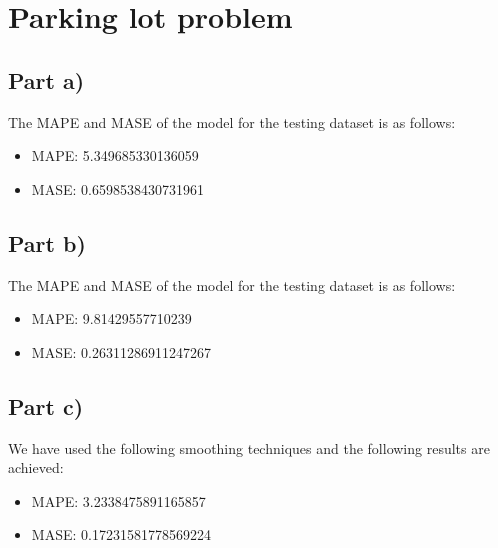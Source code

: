 \section{Parking lot problem}
\subsection{Part a)}
The MAPE and MASE of the model for the testing dataset is as follows:
\begin{itemize}[noitemsep]
	\item MAPE:  5.349685330136059
	\item MASE:  0.6598538430731961
\end{itemize}


\subsection{Part b)}
The MAPE and MASE of the model for the testing dataset is as follows:
\begin{itemize}[noitemsep]
	\item MAPE:  9.81429557710239
	\item MASE:  0.26311286911247267
\end{itemize}

\subsection{Part c)}
We have used the following smoothing techniques and the following results are achieved:
\begin{itemize}
	\item MAPE:  3.2338475891165857
	\item MASE:  0.17231581778569224
\end{itemize}
